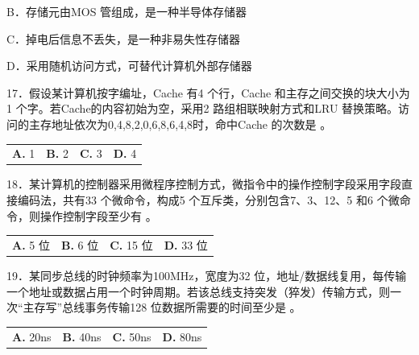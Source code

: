 \documentclass[UTF8,11pt]{ctexart}
\begin{document}
B．存储元由MOS 管组成，是一种半导体存储器


C．掉电后信息不丢失，是一种非易失性存储器


D．采用随机访问方式，可替代计算机外部存储器


17．假设某计算机按字编址，Cache 有4 个行，Cache 和主存之间交换的块大小为1 个字。若Cache的内容初始为空，采用2 路组相联映射方式和LRU 替换策略。访问的主存地址依次为0,4,8,2,0,6,8,6,4,8时，命中Cache 的次数是 。


\begin{center}\begin{tabular}{>{\raggedright\arraybackslash}p{\dimexpr(\linewidth-8\tabcolsep)/4\relax}>{\raggedright\arraybackslash}p{\dimexpr(\linewidth-8\tabcolsep)/4\relax}>{\raggedright\arraybackslash}p{\dimexpr(\linewidth-8\tabcolsep)/4\relax}>{\raggedright\arraybackslash}p{\dimexpr(\linewidth-8\tabcolsep)/4\relax}}
\textbf{A.} 1 & \textbf{B.} 2 & \textbf{C.} 3 & \textbf{D.} 4\\[.35em]\end{tabular}\end{center}

18．某计算机的控制器采用微程序控制方式，微指令中的操作控制字段采用字段直接编码法，共有33 个微命令，构成5 个互斥类，分别包含7、3、12、5 和6 个微命令，则操作控制字段至少有 。


\begin{center}\begin{tabular}{>{\raggedright\arraybackslash}p{\dimexpr(\linewidth-8\tabcolsep)/4\relax}>{\raggedright\arraybackslash}p{\dimexpr(\linewidth-8\tabcolsep)/4\relax}>{\raggedright\arraybackslash}p{\dimexpr(\linewidth-8\tabcolsep)/4\relax}>{\raggedright\arraybackslash}p{\dimexpr(\linewidth-8\tabcolsep)/4\relax}}
\textbf{A.} 5 位 & \textbf{B.} 6 位 & \textbf{C.} 15 位 & \textbf{D.} 33 位\\[.35em]\end{tabular}\end{center}

19．某同步总线的时钟频率为100MHz，宽度为32 位，地址/数据线复用，每传输一个地址或数据占用一个时钟周期。若该总线支持突发（猝发）传输方式，则一次“主存写”总线事务传输128 位数据所需要的时间至少是 。


\begin{center}\begin{tabular}{>{\raggedright\arraybackslash}p{\dimexpr(\linewidth-8\tabcolsep)/4\relax}>{\raggedright\arraybackslash}p{\dimexpr(\linewidth-8\tabcolsep)/4\relax}>{\raggedright\arraybackslash}p{\dimexpr(\linewidth-8\tabcolsep)/4\relax}>{\raggedright\arraybackslash}p{\dimexpr(\linewidth-8\tabcolsep)/4\relax}}
\textbf{A.} 20ns & \textbf{B.} 40ns & \textbf{C.} 50ns & \textbf{D.} 80ns\\[.35em]\end{tabular}\end{center}
\end{document}
